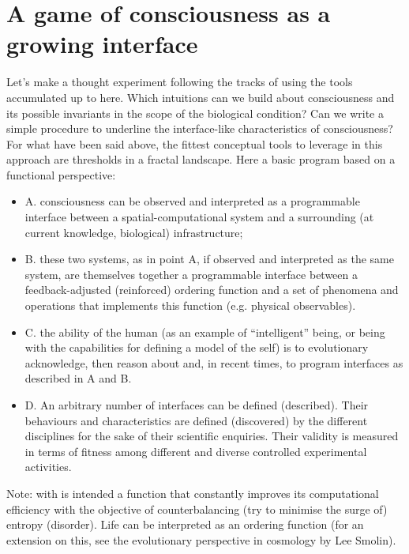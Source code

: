\documentclass[14pt,a4paper]{extarticle}
\begin{document}
\section*{A game of consciousness as a growing interface}
\label{sec:consciousness}


\hspace*{15mm}Let’s make a thought experiment following the tracks of \cite{hofstadter1981mind,hofstadter2000godel} using the tools accumulated up to here. Which intuitions can we build about consciousness and its possible invariants in the scope of the biological condition? Can we write a simple procedure to underline the interface-like characteristics of consciousness? For what have been said above, the fittest conceptual tools to leverage in this approach are thresholds in a fractal landscape. Here a basic program based on a functional perspective: 
\begin{itemize}
\item A. consciousness can be observed  and interpreted as a programmable interface between a spatial-computational system and a surrounding (at current knowledge, biological) infrastructure;
\item B. these two systems, as in point A, if observed and interpreted as the same system, are themselves together a programmable interface between a feedback-adjusted (reinforced) ordering function and a set of phenomena and operations that implements this function (e.g. physical observables).
\item C. the ability of the human (as an example of “intelligent” being, or being with the capabilities for defining a model of the self) is to evolutionary acknowledge, then reason about and, in recent times, to program interfaces as described in A and B.
\item D. An arbitrary number of interfaces can be defined (described). Their behaviours and characteristics are defined (discovered) by the different disciplines for the sake of their scientific enquiries. Their validity is measured in terms of fitness among different and diverse controlled experimental activities.
\end{itemize}
Note: with  is intended a function that constantly improves its computational efficiency with the objective of counterbalancing (try to minimise the surge of) entropy (disorder). Life can be interpreted as an ordering function (for an extension on this, see the evolutionary perspective in cosmology by Lee Smolin).
\newline
\end{document}
